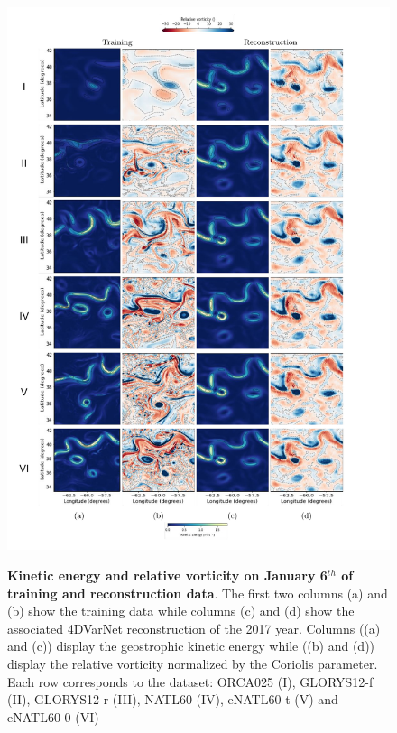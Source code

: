 \begin{bibunit}
\begin{figure}[H]

\begin{center}

\includegraphics[width=\linewidth]{./00_Simulearning/standalone_figures/maps.pdf}

\caption{\textbf{ 
Kinetic energy and relative vorticity on January 6$^{th}$ of training and reconstruction data}.
The first two columns (a) and (b) show the training data while columns (c) and (d) show the associated 4DVarNet reconstruction of the 2017 year.
Columns ((a) and (c)) display the geostrophic kinetic energy while ((b) and (d)) display the relative vorticity normalized by the Coriolis parameter.
Each row corresponds to the dataset: ORCA025 (I), GLORYS12-f (II), GLORYS12-r (III), NATL60 (IV), eNATL60-t (V) and eNATL60-0 (VI)}
\vspace{-5mm}
\label{c4fig:maps}
\end{center}
\end{figure}



\end{bibunit}
